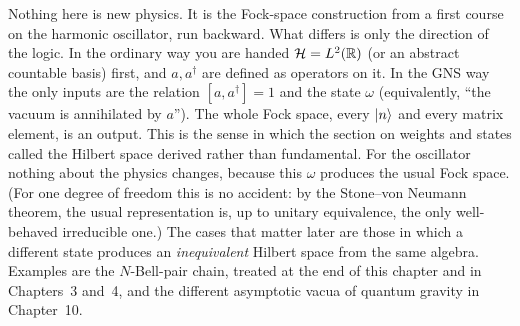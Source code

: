 \begin{physconnect}
Nothing here is new physics. It is the Fock-space construction from a first course on the harmonic
oscillator, run backward. What differs is only the direction of the logic. In the ordinary way you are handed
$\mathcal{H}=L^2(\mathbb R)$ (or an abstract countable basis) first, and $a,a^\dagger$ are defined as operators on
it. In the GNS way the only inputs are the relation $[a,a^\dagger]=1$ and the state $\omega$ (equivalently,
``the vacuum is annihilated by $a$''). The whole Fock space, every $\ket n$ and every matrix element, is an
output. This is the sense in which the section on weights and states called the Hilbert space derived rather
than fundamental. For the oscillator nothing about the physics changes, because this $\omega$ produces the
usual Fock space. (For one degree of freedom this is no accident: by the Stone--von Neumann theorem, the
usual representation is, up to unitary equivalence, the only well-behaved irreducible one.) The cases that matter later
are those in which a different state produces an \emph{inequivalent} Hilbert space from the same
algebra. Examples are the $N$-Bell-pair chain, treated at the end of this chapter and in Chapters~3 and~4,
and the different asymptotic vacua of quantum gravity in Chapter~10.
\end{physconnect}

